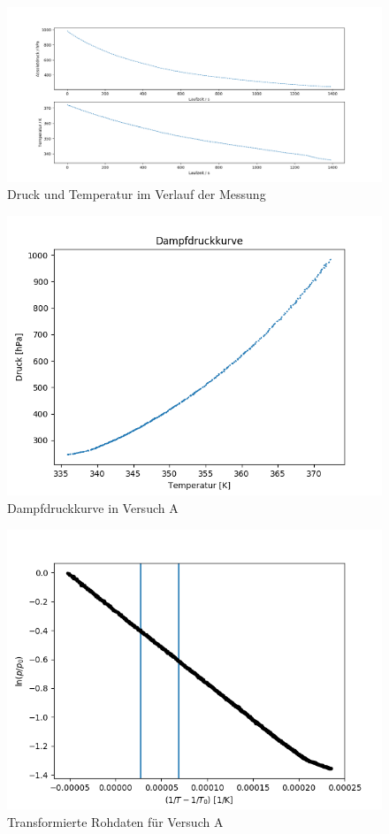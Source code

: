 \documentclass[12pt,a4paper]{article}
\begin{document}
\begin{figure}
\includegraphics[width=\linewidth]{Bilder/Rohdaten_HauptmessungA.png}
\caption[Dichtigkeit vor Hauptversuch Apparatur A]{Druck und Temperatur im Verlauf der Messung}
\label{fig:RohdatenA}
\end{figure}

\begin{figure}
\includegraphics[width=\linewidth]{Bilder/DampfdruckkurveA.png}
\caption[Dampfdruckkurve A]{Dampfdruckkurve in Versuch A}
\label{fig:DampfA}
\end{figure}

\begin{figure}
\includegraphics[width=\linewidth]{Bilder/log_RohdatenA.png}
\caption[Transformierte Daten A]{Transformierte Rohdaten für Versuch A}
\label{fig:logA}
\end{figure}
\end{document}
